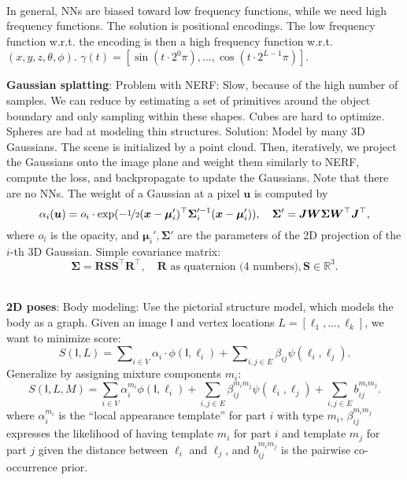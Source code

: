 \documentclass{article}
\newcommand{\R}{\mathbb{R}}
\renewcommand{\vec}[1]{\bm{#1}}
\newcommand{\mat}[1]{\bm{#1}}
\newcommand{\tens}[1]{\bm{\mathsf{#1}}}
\newenvironment{topic}[1]
{\textbf{\sffamily \colorbox{black}{\rlap{\textbf{\textcolor{white}{#1}}}\hspace{\linewidth}\hspace{-2\fboxsep}}} \\ \vspace{0.2cm}}
{}
\begin{document}
\begin{multicols*}{2}
\begin{topic}{Implicit surfaces and neural radiance fields}
        In general, NNs are biased toward low frequency functions, while we need high frequency functions.
        The solution is positional encodings. The low frequency function w.r.t. the encoding is then a high
        frequency function w.r.t. $(x,y,z,\theta,\phi)$. $\gamma(t) = [\sin(t\cdot 2^0 \pi), \ldots, \cos(t
            \cdot 2^{L-1} \pi)]$.

        \textbf{Gaussian splatting}: Problem with NERF: Slow, because of the high number of samples.
        We can reduce by estimating a set of primitives around the object boundary and only sampling
        within these shapes. Cubes are hard to optimize. Spheres are bad at modeling thin structures.
        Solution: Model by many 3D Gaussians. The scene is initialized by a point cloud. Then,
        iteratively, we project the Gaussians onto the image plane and weight them similarly to NERF,
        compute the loss, and backpropagate to update the Gaussians. Note that there are no
        NNs. The weight of a Gaussian at a pixel $\vec{u}$ is computed by \[
            \alpha_i(\vec{u}) = o_i \cdot \exp ( -\nicefrac{1}{2} (\vec{x} - \vec{\mu}_i')^\top \mat{\Sigma}_i'^{-1} (\vec{x} - \vec{\mu}_i')), \quad \mat{\Sigma}' = \mat{J} \mat{W} \mat{\Sigma} \mat{W}^\top \mat{J}^\top,
        \]
        where $o_i$ is the opacity, and $\vec{\mu}_i', \mat{\Sigma}'$ are the parameters of the 2D
        projection of the $i$-th 3D Gaussian. Simple covariance matrix: \[
            \mat{\Sigma} = \mat{R} \mat{S} \mat{S}^\top \mat{R}^\top, \quad \mat{R} \text{ as quaternion (4 numbers)}, \mat{S} \in \R^3.
        \]

    \end{topic}

    \begin{topic}{Parametric human body models}
        \textbf{2D poses}: Body modeling: Use the pictorial structure model, which models the body
        as a graph. Given an image $\tens{I}$ and vertex locations $L = [\ell_1, \ldots, \ell_k]$, we want
        to minimize score: \[
            S(\tens{I}, L) = \sum\nolimits_{i\in V} \alpha_i \cdot \phi(\tens{I}, \ell_i) + \sum\nolimits_{i,j \in E} \beta_{ij} \psi(\ell_i, \ell_j).
        \]
        Generalize by assigning mixture components $m_i$: \[
            S(\tens{I}, L, M) = \sum_{i\in V} \alpha_i^{m_i} \phi(\tens{I}, \ell_i) + \sum_{i,j \in E} \beta_{ij}^{m_im_j} \psi(\ell_i,\ell_j) + \sum_{i,j \in E} b_{ij}^{m_im_j}.
        \]
        where $\alpha^{m_i}_i$ is the ``local appearance template'' for part $i$ with type $m_i$,
        $\beta^{m_im_j}_{ij}$ expresses the likelihood of having template $m_i$ for part $i$ and template
        $m_j$ for part $j$ given the distance between $\ell_i$ and $\ell_j$, and $b_{ij}^{m_im_j}$ is the
        pairwise co-occurrence prior.


\end{topic}
\end{multicols*}
\end{document}
